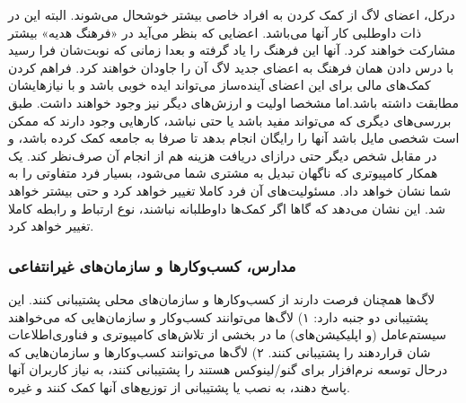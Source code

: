 درکل، اعضای لاگ از کمک کردن به افراد خاصی بیشتر خوشحال می‌شوند.
البته این در ذات داوطلبی کار آنها می‌باشد. اعضایی که بنظر می‌آید
در «فرهنگ هدیه» بیشتر مشارکت خواهند کرد. آنها این فرهنگ
را یاد گرفته و بعدا زمانی که نوبت‌شان فرا رسید با درس دادن همان فرهنگ
به اعضای جدید لاگ آن را جاودان خواهند کرد.
فراهم کردن کمک‌های مالی برای این اعضای آینده‌ساز می‌تواند ایده خوبی باشد
و با نیازهایشان مطابقت داشته باشد.اما مشخصا اولیت‌
و ارزش‌های دیگر نیز وجود خواهند داشت.
طبق بررسی‌های دیگری که می‌تواند مفید باشد یا حتی نباشد،
کارهایی وجود دارند که ممکن است شخصی مایل باشد آنها را
رایگان انجام بدهد تا صرفا به جامعه کمک کرده باشد،
و در مقابل شخص دیگر حتی درازای دریافت هزینه هم
از انجام آن صرف‌نظر کند.
یک همکار کامپیوتری که ناگهان تبدیل به مشتری شما می‌شود،
بسیار فرد متفاوتی را به شما نشان خواهد داد. مسئولیت‌های
آن فرد کاملا تغییر خواهد کرد و حتی بیشتر خواهد شد.
این نشان می‌دهد که گاها اگر کمک‌ها داوطلبانه نباشند،
نوع ارتباط و رابطه کاملا تغییر خواهد کرد.

\subsubsection{مدارس، کسب‌وکارها و سازمان‌های غیرانتفاعی}

لاگ‌ها همچنان فرصت دارند از کسب‌و‌کارها و سازمان‌‌های محلی
پشتیبانی کنند. این پشتیبانی دو جنبه دارد:
۱) لاگ‌ها می‌توانند کسب‌وکار و سازمان‌هایی که می‌خواهند
سیستم‌عامل (و اپلیکیشن‌های) ما در بخشی از تلاش‌های
کامپیوتری و فناوری‌اطلاعات شان قراردهند را پشتیبانی کنند.
۲) لاگ‌ها می‌توانند کسب‌وکارها و سازمان‌هایی که درحال
توسعه نرم‌افزار برای گنو/لینوکس هستند را پشتیبانی کنند،
به نیاز کاربران آنها پاسخ دهند، به نصب یا پشتیبانی از
توزیع‌های آنها کمک کنند و غیره.

